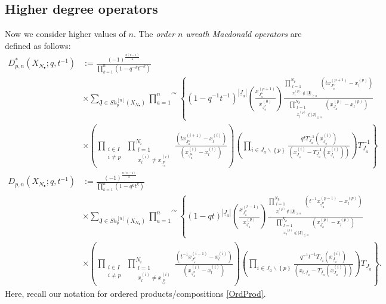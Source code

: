 \documentclass{amsart}
\renewcommand{\triangle}{\vartriangle}
\newcommand{\Ju}{{\underline{J}}}
\theoremstyle{remark}
\numberwithin{thm}{section}
\numberwithin{equation}{section}
\begin{document}
\subsection{Higher degree operators}
Now we consider higher values of $n$.
The \textit{order $n$ wreath Macdonald operators} are defined as follows:
\begin{align}
\label{D*pnDef}
D_{p,n}^*(X_{N_\bullet};q,t^{-1})
&:=
\frac{(-1)^{\frac{n(n-1)}{2}}}{\prod_{k=1}^n(1-q^{-k}t^{-k})}\\
\nonumber
&\times
\sum_{\mathbf{\Ju}\in Sh_p^{[n]}(X_{N_\bullet})}
\overset{\curvearrowright}{\prod_{a=1}^n}
\left\{(1-q^{-1}t^{-1})^{|\Ju_a|}\left(\frac{x^{(p+1)}_{\Ju_a^\triangle}}{x^{(0)}_{\Ju_a^\triangle}}\right)
\frac{\displaystyle
\prod_{\substack{l=1\\x^{(p)}_{l}\not\in|\mathbf{\Ju}|_{\ge a}}}^{N_p}\left( tx^{(p+1)}_{\Ju_a^\triangle}-x^{(p)}_{l} \right)}
{\displaystyle
\prod_{\substack{l=1\\x^{(p)}_{l}\not\in|\mathbf{\Ju}|_{\le a}}}^{N_p}\left( x^{(p)}_{\Ju_a}-x^{(p)}_{l} \right)}\right.\\
\nonumber
&\times
\left.
\left( \prod_{\substack{i\in I\\i\not= p}}\, 
\prod_{\substack{l=1\\x^{(i)}_{l}\not=x^{(i)}_{\Ju_a^\triangle}}}^{N_i}\frac{\left(tx^{(i+1)}_{\Ju_a^\triangle}-x^{(i)}_{l}\right)}
{\left( x^{(i)}_{\Ju_a^\triangle}-x^{(i)}_{l} \right)}
\right)
\left( \prod_{i\in J_a\backslash \left\{ p \right\}} 
\frac{qt T_{\Ju_a}^{-1}(x^{(i)}_{\Ju_a})}
{\left( x^{(i)}_{\Ju_a}-T_{\Ju_a}^{-1}(x^{(i)}_{\Ju_a}) \right)}
\right) T_{\Ju_a}^{-1}\right\}\\
\label{DpnDef}
D_{p,n}(X_{N_\bullet};q,t^{-1})
&:=
\frac{(-1)^{\frac{n(n-1)}{2}}}{\prod_{k=1}^n(1-q^{k}t^{k})}\\
\nonumber
&\times\sum_{\mathbf{\Ju}\in Sh_p^{[n]}(X_{N_\bullet})}
\overset{\curvearrowright}{\prod_{a=1}^n}
\left\{(1-qt)^{|\Ju_a|}\left(\frac{x^{(r-1)}_{\Ju_a^\triangledown}}{x^{(p)}_{\Ju_a}}\right)
\frac{\displaystyle
\prod_{\substack{l=1\\x^{(p)}_{l}\not\in|\mathbf{\Ju}|_{\ge a}}}^{N_p}\left( t^{-1}x^{(p-1)}_{\Ju_a^\triangledown}-x^{(p)}_{l} \right)}
{\displaystyle
\prod_{\substack{l=1\\x^{(p)}_{l}\not\in|\mathbf{\Ju}|_{\le a}}}^{N_p}\left( x^{(p)}_{\Ju_a}-x^{(p)}_{l} \right)}\right.\\
\nonumber
&\times
\left.
\left( \prod_{\substack{i\in I\\i\not= p}}\, 
\prod_{\substack{l=1\\x^{(i)}_{l}\not=x^{(i)}_{\Ju_a^\triangledown}}}^{N_i}\frac{\left(t^{-1}x^{(i-1)}_{\Ju_a^\triangledown}-x^{(i)}_{l}\right)}
{\left( x^{(i)}_{\Ju_a^\triangledown}-x^{(i)}_{l} \right)}
\right)
\left( \prod_{i\in J_a\backslash \left\{ p \right\}} 
\frac{q^{-1}t^{-1} T_{\Ju_a}(x^{(i)}_{\Ju_a})}
{\left( x_{i,\Ju_a}-T_{\Ju_a}(x^{(i)}_{\Ju_a}) \right)}
\right) T_{\Ju_a}\right\}.
\end{align}
Here, recall our notation for ordered products/compositions \eqref{OrdProd}.
\end{document}
